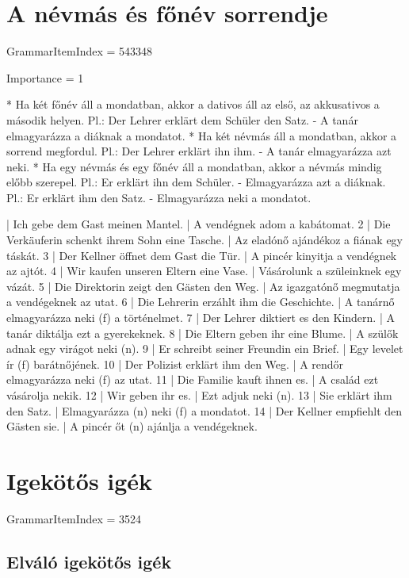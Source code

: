 \documentclass{article}
\newenvironment{desc}{\verbatim}{\endverbatim}
\newenvironment{exmp}{\verbatim}{\endverbatim}
\begin{document}
\section{A névmás és főnév sorrendje}

GrammarItemIndex = 543348

Importance = 1

\begin{desc}
* Ha két főnév áll a mondatban, akkor a dativos áll az első, az akkusativos a második helyen.
  Pl.: Der Lehrer erklärt dem Schüler den Satz. - A tanár elmagyarázza a diáknak a mondatot.
* Ha két névmás áll a mondatban, akkor a sorrend megfordul.
  Pl.: Der Lehrer erklärt ihn ihm. - A tanár elmagyarázza azt neki.
* Ha egy névmás és egy főnév áll a mondatban, akkor a névmás mindig előbb szerepel.
  Pl.: Er erklärt ihn dem Schüler. - Elmagyarázza azt a diáknak.
  Pl.: Er erklärt ihm den Satz. - Elmagyarázza neki a mondatot.
\end{desc}

\begin{exmp}
1 | Ich gebe dem Gast meinen Mantel. | A vendégnek adom a kabátomat.
2 | Die Verkäuferin schenkt ihrem Sohn eine Tasche. | Az eladónő ajándékoz a fiának egy táskát.
3 | Der Kellner öffnet dem Gast die Tür. | A pincér kinyitja a vendégnek az ajtót.
4 | Wir kaufen unseren Eltern eine Vase. | Vásárolunk a szüleinknek egy vázát.
5 | Die Direktorin zeigt den Gästen den Weg. | Az igazgatónő megmutatja a vendégeknek az utat.
6 | Die Lehrerin erzáhlt ihm die Geschichte. | A tanárnő elmagyarázza neki (f) a történelmet.
7 | Der Lehrer diktiert es den Kindern. | A tanár diktálja ezt a gyerekeknek.
8 | Die Eltern geben ihr eine Blume. | A szülők adnak egy virágot neki (n).
9 | Er schreibt seiner Freundin ein Brief. | Egy levelet ír (f) barátnőjének.
10 | Der Polizist erklärt ihm den Weg. | A rendőr elmagyarázza neki (f) az utat.
11 | Die Familie kauft ihnen es. | A család ezt vásárolja nekik.
12 | Wir geben ihr es. | Ezt adjuk neki (n).
13 | Sie erklärt ihm den Satz. | Elmagyarázza (n) neki (f) a mondatot.
14 | Der Kellner empfiehlt den Gästen sie. | A pincér őt (n) ajánlja a vendégeknek.
\end{exmp}

\section{Igekötős igék}

GrammarItemIndex = 3524

\subsection{Elváló igekötős igék}
\end{document}
